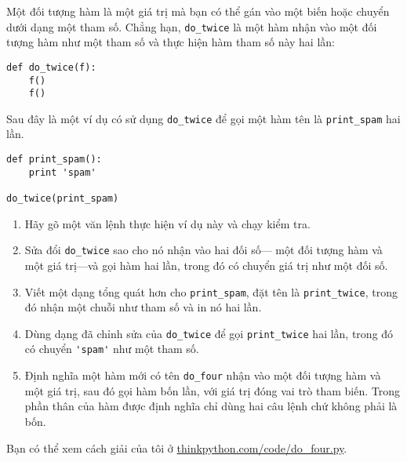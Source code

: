 \documentclass[11pt]{book}
\begin{document}
\begin{ex}

Một đối tượng hàm là một giá trị mà bạn có thể gán vào một biến hoặc
chuyển dưới dạng một tham số. Chẳng hạn, \verb"do_twice" là một hàm
nhận vào một đối tượng hàm như một tham số và thực hiện hàm tham số
này hai lần:

\beforeverb
\begin{verbatim}
def do_twice(f):
    f()
    f()
\end{verbatim}
\afterverb

Sau đây là một ví dụ có sử dụng \verb"do_twice" để gọi một hàm tên là
\verb"print_spam" hai lần.

\beforeverb
\begin{verbatim}
def print_spam():
    print 'spam'

do_twice(print_spam)
\end{verbatim}
\afterverb

\begin{enumerate}

\item Hãy gõ một văn lệnh thực hiện ví dụ này và chạy kiểm tra.

\item Sửa đổi \verb"do_twice" sao cho nó nhận vào hai đối số---
một đối tượng hàm và một giá trị---và gọi hàm hai lần, trong đó có
chuyển giá trị như một đối số.

\item Viết một dạng tổng quát hơn cho \verb"print_spam", đặt tên là
\verb"print_twice", trong đó nhận một chuỗi như tham số và in nó
hai lần.

\item Dùng dạng đã chỉnh sửa của \verb"do_twice" để gọi
\verb"print_twice" hai lần, trong đó có chuyển \verb"'spam'" như một
tham số.

\item Định nghĩa một hàm mới có tên
\verb"do_four" nhận vào một đối tượng hàm và một giá trị, sau đó 
gọi hàm bốn lần, với giá trị đóng vai trò tham biến. Trong phần
thân của hàm được định nghĩa chỉ dùng hai câu lệnh chứ không phải
là bốn.

\end{enumerate}

Bạn có thể xem cách giải của tôi ở \url{thinkpython.com/code/do_four.py}.

\end{ex}
\end{document}
